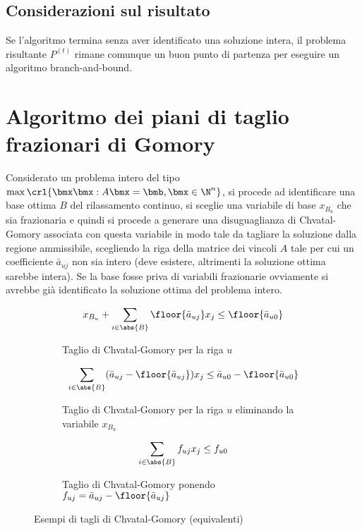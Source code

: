 \documentclass[\main/main.tex]{subfiles}
\begin{document}
\subsection{Considerazioni sul risultato}
Se l'algoritmo termina senza aver identificato una soluzione intera, il problema risultante \(P^{(t)}\) rimane comunque un buon punto di partenza per eseguire un algoritmo branch-and-bound.

\section{Algoritmo dei piani di taglio frazionari di Gomory}
Considerato un problema intero del tipo \(\max\crl{\bmx\bmx: A\bmx = \bmb, \bmx \in \N^n}\), si procede ad identificare una base ottima \(B\) del rilassamento continuo, si sceglie una variabile di base \(x_{B_u}\) che sia frazionaria e quindi si procede a generare una disuguaglianza di Chvatal-Gomory associata con questa variabile in modo tale da tagliare la soluzione dalla regione ammissibile, scegliendo la riga della matrice dei vincoli \(A\) tale per cui un coefficiente \(\bar{a}_{uj}\) non sia intero (deve esistere, altrimenti la soluzione ottima sarebbe intera). Se la base fosse priva di variabili frazionarie ovviamente si avrebbe già identificato la soluzione ottima del problema intero.

\begin{figure}
    \begin{subfigure}{0.33\textwidth}
        \[
            x_{B_u} + \sum_{i \in \abs{B}} \floor{\bar{a}_{uj}}x_j \leq \floor{\bar{a}_{u0}}
        \]
        \caption{Taglio di Chvatal-Gomory per la riga \(u\)}
    \end{subfigure}
    \begin{subfigure}{0.33\textwidth}
        \[
            \sum_{i \in \abs{B}} (\bar{a}_{uj} - \floor{\bar{a}_{uj}})x_j \leq \bar{a}_{u0} - \floor{\bar{a}_{u0}}
        \]
        \caption{Taglio di Chvatal-Gomory per la riga \(u\) eliminando la variabile \(x_{B_u}\)}
    \end{subfigure}
    \begin{subfigure}{0.33\textwidth}
        \[
            \sum_{i \in \abs{B}} f_{uj}x_j \leq f_{u0}
        \]
        \caption{Taglio di Chvatal-Gomory ponendo \(f_{uj} = \bar{a}_{uj} - \floor{\bar{a}_{uj}}\) }
    \end{subfigure}
\caption{Esempi di tagli di Chvatal-Gomory (equivalenti)}
\end{figure}
\end{document}
